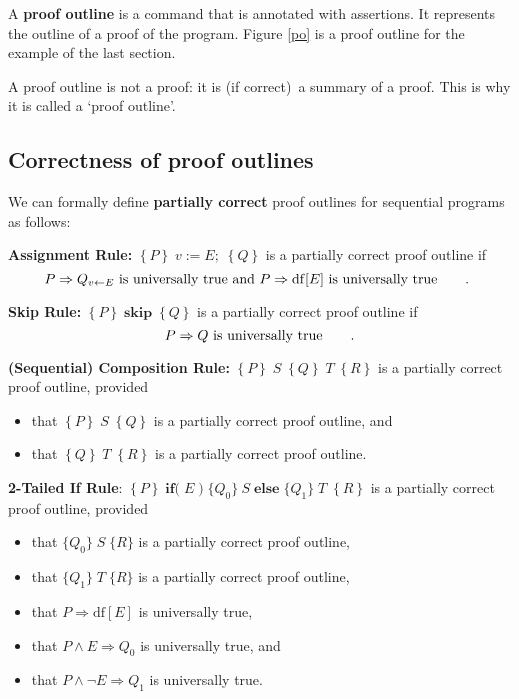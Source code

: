 \documentclass[muchmore,11pt]{article}%
\begin{document}
A \textbf{proof outline} is a command that is annotated with assertions. It
represents the outline of a proof of the program. Figure \ref{po} is a proof
outline for the example of the last section.

A proof outline is not a proof: it is (if correct)\ a summary of a proof. This
is why it is called a `proof outline'.

\subsection{Correctness of proof outlines}

We can formally define \textbf{partially correct} proof outlines for
sequential programs as follows:

\textbf{Assignment Rule:} $\left\{  P\right\}  \;v:=E;\;\left\{  Q\right\}  $
is a partially correct proof outline if
\[
P\Rightarrow Q_{v\leftarrow E}\text{ is universally true and }P\Rightarrow
\mathrm{df}[E]\text{ is universally true\qquad. }%
\]


\textbf{Skip Rule:} $\left\{  P\right\}  \;\mathbf{skip}\;\left\{  Q\right\}
$ is a partially correct proof outline if%
\[
P\Rightarrow Q\text{ is universally true\qquad.}%
\]


\textbf{(Sequential) Composition Rule:} $\left\{  P\right\}  \;S\;\left\{
Q\right\}  \;T\;\left\{  R\right\}  $ is a partially correct proof outline, provided

\begin{itemize}
\item that $\left\{  P\right\}  \;S\;\left\{  Q\right\}  $ is a partially
correct proof outline, and

\item that $\left\{  Q\right\}  \;T\;\left\{  R\right\}  $ is a partially
correct proof outline.
\end{itemize}

\textbf{2-Tailed If Rule}: $\left\{  P\right\}  \;\mathbf{if(}\;E\;)\;\{Q_{0}%
\}\ S\;\mathbf{else}\;\{Q_{1}\}\;T\;\left\{  R\right\}  $ is a partially
correct proof outline, provided

\begin{itemize}
\item that $\{Q_{0}\}\;S\;\{R\}$ is a partially correct proof outline,

\item that $\{Q_{1}\}\;T\;\{R\}$ is a partially correct proof outline,

\item that $P\Rightarrow\mathrm{df}[E]$ is universally true,

\item that $P\wedge E\Rightarrow Q_{0}$ is universally true, and

\item that $P\wedge\lnot E\Rightarrow Q_{1}$ is universally true.
\end{itemize}
\end{document}
